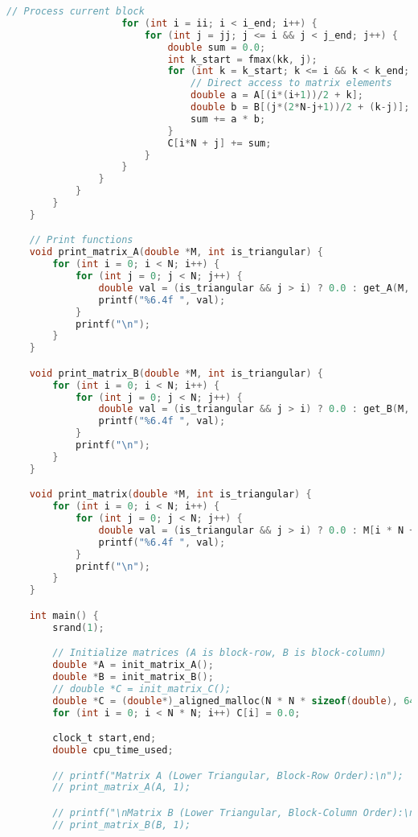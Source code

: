 \documentclass[14pt, russian]{matmex-diploma-custom}
\begin{document}
{\begin{lstlisting}[language=C, caption={Приложение 1D массивов с блочной оптимизацией}]
                    // Process current block
                    for (int i = ii; i < i_end; i++) {
                        for (int j = jj; j <= i && j < j_end; j++) {
                            double sum = 0.0;
                            int k_start = fmax(kk, j);
                            for (int k = k_start; k <= i && k < k_end; k++) {
                                // Direct access to matrix elements
                                double a = A[(i*(i+1))/2 + k];
                                double b = B[(j*(2*N-j+1))/2 + (k-j)];
                                sum += a * b;
                            }
                            C[i*N + j] += sum;
                        }
                    }
                }
            }
        }
    }

    // Print functions
    void print_matrix_A(double *M, int is_triangular) {
        for (int i = 0; i < N; i++) {
            for (int j = 0; j < N; j++) {
                double val = (is_triangular && j > i) ? 0.0 : get_A(M, i , j);
                printf("%6.4f ", val);
            }
            printf("\n");
        }
    }

    void print_matrix_B(double *M, int is_triangular) {
        for (int i = 0; i < N; i++) {
            for (int j = 0; j < N; j++) {
                double val = (is_triangular && j > i) ? 0.0 : get_B(M, i , j);
                printf("%6.4f ", val);
            }
            printf("\n");
        }
    }

    void print_matrix(double *M, int is_triangular) {
        for (int i = 0; i < N; i++) {
            for (int j = 0; j < N; j++) {
                double val = (is_triangular && j > i) ? 0.0 : M[i * N + j];
                printf("%6.4f ", val);
            }
            printf("\n");
        }
    }

    int main() {
        srand(1);

        // Initialize matrices (A is block-row, B is block-column)
        double *A = init_matrix_A();
        double *B = init_matrix_B();
        // double *C = init_matrix_C();
        double *C = (double*)_aligned_malloc(N * N * sizeof(double), 64);
        for (int i = 0; i < N * N; i++) C[i] = 0.0;

        clock_t start,end;
        double cpu_time_used;

        // printf("Matrix A (Lower Triangular, Block-Row Order):\n");
        // print_matrix_A(A, 1);

        // printf("\nMatrix B (Lower Triangular, Block-Column Order):\n");
        // print_matrix_B(B, 1);


\end{lstlisting}}
\end{document}
